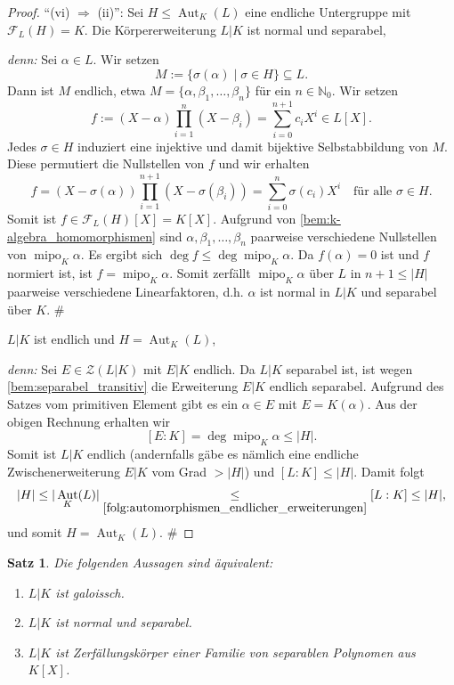 \documentclass[a4paper, twoside, 11pt, ngerman]{report}
\newcommand{\NN}{\mathds N}
\newcommand{\calF}{\mathcal F}
\newcommand{\calZ}{\mathcal Z}
\DeclareMathOperator{\Aut}{Aut}
\DeclareMathOperator{\mipo}{mipo}
\theoremstyle{definistyle}
\newtheorem{satz}{Satz}[section]
\theoremstyle{remark}
\newenvironment{denn}%
  {\par\textit{denn:}}%
  {\hfill\#\par}
\begin{document}
\begin{proof}
"`(vi) $\Rightarrow$ (ii)"': Sei $H \leq \Aut_K(L)$ eine endliche Untergruppe mit $\calF_L(H) = K$.
Die Körpererweiterung $L|K$ ist normal und separabel,
\begin{denn}
Sei $\alpha \in L$. Wir setzen
\[
M := \{\sigma(\alpha) \mid \sigma \in H\}\subseteq L.
\]
Dann ist $M$ endlich, etwa $M = \{\alpha, \beta_1, \ldots,\beta_n\}$ für ein $n \in \NN_0$. Wir setzen
\[
f:= (X - \alpha) \prod_{i=1}^n (X - \beta_i) = \sum_{i=0}^{n+1} c_i X^i \in L[X].
\]
Jedes $\sigma \in H$ induziert eine injektive und damit bijektive Selbstabbildung von $M$. Diese permutiert die Nullstellen von $f$ und wir erhalten
\[
f = (X - \sigma(\alpha)) \prod_{i=1}^{n+1} (X - \sigma(\beta_i)) = \sum_{i=0}^n \sigma(c_i) X^i \quad \text{für alle } \sigma \in H.
\]
Somit ist $f\in \calF_L(H)[X] = K[X]$. Aufgrund von \ref{bem:k-algebra_homomorphismen}
sind $\alpha, \beta_1, \dots, \beta_n$ paarweise verschiedene Nullstellen von $\mipo_K \alpha$. Es ergibt sich
$\deg f \leq \deg \mipo_K \alpha$. Da $f(\alpha)=0$ ist und $f$ normiert ist, ist $f=\mipo_K\alpha$.
Somit zerfällt $\mipo_K\alpha$ über $L$ in $n+1\leq|H|$ paarweise verschiedene Linearfaktoren, d.h. $\alpha$ ist
normal in $L|K$ und separabel über $K$.
\end{denn}
$L|K$ ist endlich und $H = \Aut_K(L)$,
\begin{denn}
Sei $E \in \calZ(L|K)$ mit $E|K$ endlich. Da $L|K$ separabel ist, ist wegen \ref{bem:separabel_transitiv} die
Erweiterung $E|K$ endlich separabel. Aufgrund des Satzes vom primitiven Element gibt es ein $\alpha \in E$ mit $E = K(\alpha)$. Aus der obigen Rechnung erhalten wir
\[
[E : K] = \deg\mipo_K\alpha \leq |H|.
\]
Somit ist $L|K$ endlich (andernfalls gäbe es nämlich eine endliche Zwischenerweiterung $E|K$ vom Grad $>|H|$)
und $[L:K]\le|H|$. Damit folgt
\[
|H| \leq |\Aut_K(L)| \underset{\ref{folg:automorphismen_endlicher_erweiterungen}}{\leq} [L : K] \leq |H|,
\]
und somit $H = \Aut_K(L)$.
\end{denn}
\end{proof}

\begin{satz}\label{satz:char_galoissch}
Die folgenden Aussagen sind äquivalent:
\begin{enumerate}
    \item[(i)] $L|K$ ist galoissch.
    \item[(ii)] $L|K$ ist normal und separabel.
    \item[(iii)] $L|K$ ist Zerfällungskörper einer Familie von separablen Polynomen aus $K[X]$.
\end{enumerate}
\end{satz}
\end{document}
